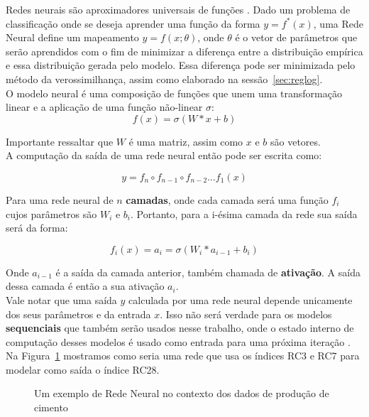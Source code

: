 \label{sec:nn}
Redes neurais são aproximadores universais de funções \citep{nnuni}. Dado um problema
de classificação onde se deseja aprender uma função da forma $y = f^*(x)$, uma
Rede Neural define um mapeamento $y = f(x ; \theta)$, onde $\theta$ é o vetor de
parâmetros que serão aprendidos com o fim de minimizar a diferença entre a
distribuição empírica e essa distribuição gerada pelo modelo. Essa diferença pode
ser minimizada pelo método da verossimilhança, assim como elaborado na sessão~\ref{sec:reglog}.\\

O modelo neural é uma composição de funções que unem uma transformação linear e
a aplicação de uma função não-linear $\sigma$: \\

\[ f(x)=  \sigma(W*x + b) \]

Importante ressaltar que $W$ é uma matriz, assim como $x$ e $b$ são vetores. \\

A computação da saída de uma rede neural então pode ser escrita como:

\[   y = f_n \circ f_{n-1} \circ f_{n-2} \dots f_1(x)  \]

Para uma rede neural de $n$ \textbf{camadas}, onde cada camada será uma função
$f_i$ cujos parâmetros são $W_i$ e $b_i$. Portanto, para a i-ésima camada da rede
sua saída será da forma: 

\[ f_i (x)=  a_i = \sigma(W_i*a_{i-1} + b_i) \]

Onde $a_{i-1}$ é a saída da camada anterior, também chamada de
\textbf{ativação}. A saída dessa camada é então a sua ativação $a_i$. \\ 

Vale notar que uma saída $y$ calculada por uma rede neural depende unicamente dos
seus parâmetros e da entrada $x$. Isso não será verdade para os modelos
\textbf{sequenciais} que também serão usados nesse trabalho, onde o estado
interno de computação desses modelos é usado como entrada para uma próxima
iteração \citep{dlbook}. \\

Na Figura~\ref{fig:nn} mostramos como seria uma rede que usa os índices RC3 e RC7 para
modelar como saída o índice RC28. \\  

\begin{figure}
  \centering
  
  \caption{Um exemplo de Rede Neural no contexto dos dados de produção de cimento}
  \label{fig:nn}
\end{figure}


